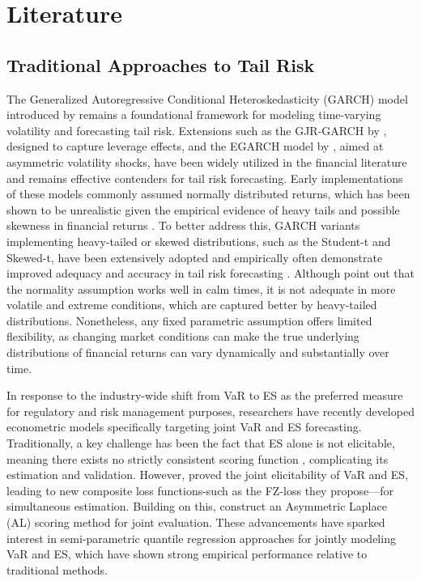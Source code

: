\section{Literature}
\label{sec:2_literature}

\subsection{Traditional Approaches to Tail Risk}
\label{sec:2.1_traditional}

The Generalized Autoregressive Conditional Heteroskedasticity (GARCH) model introduced by \textcite{bollerslev1986garch} remains a foundational framework for modeling time-varying volatility and forecasting tail risk. Extensions such as the GJR-GARCH by \textcite{GLOSTEN1993}, designed to capture leverage effects, and the EGARCH model by \textcite{Nelson1991egarch}, aimed at asymmetric volatility shocks, have been widely utilized in the financial literature and remains effective contenders for tail risk forecasting. Early implementations of these models commonly assumed normally distributed returns, which has been shown to be unrealistic given the empirical evidence of heavy tails and possible skewness in financial returns \parencite{Peir1994}. To better address this, GARCH variants implementing heavy-tailed or skewed distributions, such as the Student-t and Skewed-t, have been extensively adopted and empirically often demonstrate improved adequacy and accuracy in tail risk forecasting \parencite{Giot2004,Angelidis2004,Slim2017, Bayer2020, Braione2016}. Although \textcite{Slim2017} point out that the normality assumption works well in calm times, it is not adequate in more volatile and extreme conditions, which are captured better by heavy-tailed distributions. Nonetheless, any fixed parametric assumption offers limited flexibility, as changing market conditions can make the true underlying distributions of financial returns can vary dynamically and substantially over time. 

In response to the industry-wide shift from VaR to ES as the preferred measure for regulatory and risk management purposes, researchers have recently developed econometric models specifically targeting joint VaR and ES forecasting. Traditionally, a key challenge has been the fact that ES alone is not elicitable, meaning there exists no strictly consistent scoring function \parencite{Gneiting2011}, complicating its estimation and validation. However, \textcite{fissler2016} proved the joint elicitability of VaR and ES, leading to new composite loss functions-such as the FZ-loss they propose—for simultaneous estimation. Building on this, \textcite{Taylor2017} construct an Asymmetric Laplace (AL) scoring method for joint evaluation. These advancements have sparked interest in semi-parametric quantile regression approaches for jointly modeling VaR and ES, which have shown strong empirical performance relative to traditional methods.

